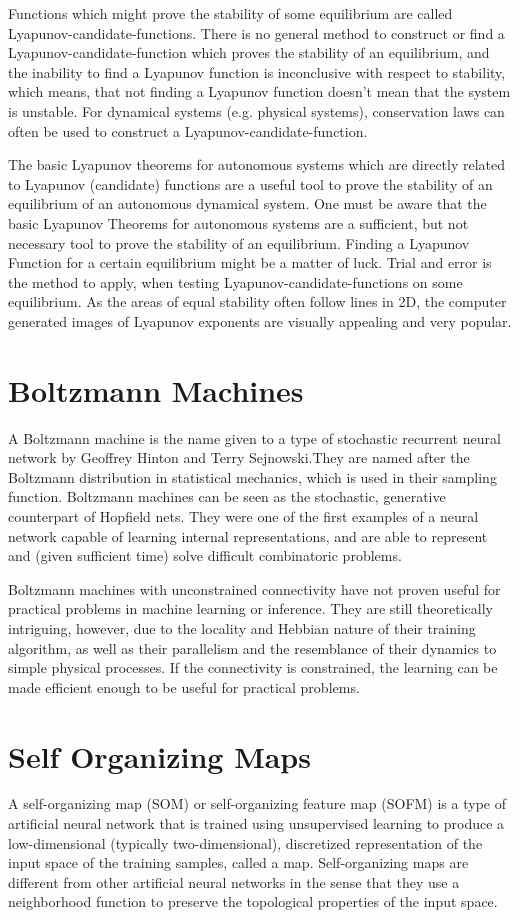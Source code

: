 \documentclass[a4paper,11pt]{report}
\begin{document}
Functions which might prove the stability of some equilibrium are
called Lyapunov-candidate-functions. There is no general method to
construct or find a Lyapunov-candidate-function which proves the
stability of an equilibrium, and the inability to find a Lyapunov
function is inconclusive with respect to stability, which means,
that not finding a Lyapunov function doesn't mean that the system
is unstable. For dynamical systems (e.g. physical systems),
conservation laws can often be used to construct a
Lyapunov-candidate-function.

The basic Lyapunov theorems for autonomous systems which are
directly related to Lyapunov (candidate) functions are a useful
tool to prove the stability of an equilibrium of an autonomous
dynamical system. One must be aware that the basic Lyapunov
Theorems for autonomous systems are a sufficient, but not
necessary tool to prove the stability of an equilibrium. Finding a
Lyapunov Function for a certain equilibrium might be a matter of
luck. Trial and error is the method to apply, when testing
Lyapunov-candidate-functions on some equilibrium. As the areas of
equal stability often follow lines in 2D, the computer generated
images of Lyapunov exponents are visually appealing and very
popular.

\section{Boltzmann Machines}
A Boltzmann machine is the name given to a type of stochastic
recurrent neural network by Geoffrey Hinton and Terry
Sejnowski.They are named after the Boltzmann distribution in
statistical mechanics, which is used in their sampling function.
Boltzmann machines can be seen as the stochastic, generative
counterpart of Hopfield nets. They were one of the first examples
of a neural network capable of learning internal representations,
and are able to represent and (given sufficient time) solve
difficult combinatoric problems.

Boltzmann machines with unconstrained connectivity have not proven
useful for practical problems in machine learning or inference.
They are still theoretically intriguing, however, due to the
locality and Hebbian nature of their training algorithm, as well
as their parallelism and the resemblance of their dynamics to
simple physical processes. If the connectivity is constrained, the
learning can be made efficient enough to be useful for practical
problems.

\section{Self Organizing Maps}
A self-organizing map (SOM) or self-organizing feature map (SOFM)
is a type of artificial neural network that is trained using
unsupervised learning to produce a low-dimensional (typically
two-dimensional), discretized representation of the input space of
the training samples, called a map. Self-organizing maps are
different from other artificial neural networks in the sense that
they use a neighborhood function to preserve the topological
properties of the input space.
\end{document}
